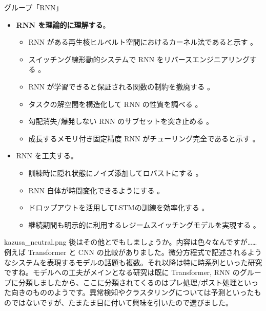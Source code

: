 \documentclass[b5paper,xelatex,ja=standard,10pt]{bxjsarticle}
\begin{document}
\vspace{1pt}
\begin{PROP}[left=0pt]{グループ「RNN」}
\begin{itemize}
  \item \textbf{RNN を理論的に理解する}。
  \begin{itemize}
    \item RNN がある再生核ヒルベルト空間におけるカーネル法であると示す \cite{AdelineFermanian2021}。
    \item スイッチング線形動的システムで RNN をリバースエンジニアリングする \cite{JimmySmith2021}。
    \item RNN が学習できると保証される関数の制約を撤廃する \cite{LifuWang2021} \cite{AbhishekPanigrahi2021}。
    \item タスクの解空間を構造化して RNN の性質を調べる \cite{EliaTurner2021}。
    \item 勾配消失/爆発しない RNN のサブセットを突き止める \cite{ZimingZhang2021}。
    \item 成長するメモリ付き固定精度 RNN がチューリング完全であると示す \cite{StephenChung2021}。
  \end{itemize}
  \vspace{6pt}
  \item RNN を工夫する。
  \begin{itemize}
    \item 訓練時に隠れ状態にノイズ添加してロバストにする \cite{SoonHoeLim2021}。
    \item RNN 自体が時間変化できるようにする \cite{AstonZhang2021}。
    \item ドロップアウトを活用してLSTMの訓練を効率化する \cite{AnupSarma2021}。
    \item 継続期間も明示的に利用するレジームスイッチングモデルを実現する \cite{AbdulFatirAnsari2021}。
  \end{itemize}
\end{itemize}
\end{PROP}
\vspace{1pt}

\begin{SERIFU}[colback=PaleIris, colbacktitle=PaleIris2]{kazusa_neutral.png}
後はその他とでもしましょうか。内容は色々なんですが……例えば Transformer と CNN の比較がありました。微分方程式で記述されるようなシステムを表現するモデルの話題も複数。それ以降は特に時系列といった研究ですね。モデルへの工夫がメインとなる研究は既に Transformer, RNN のグループに分類しましたから、ここに分類されてくるのはプレ処理/ポスト処理といった向きのもののようです。異常検知やクラスタリングについては予測といったものではないですが、たまたま目に付いて興味を引いたので選びました。
\end{SERIFU}
\end{document}
